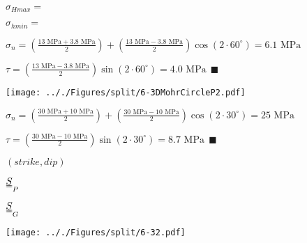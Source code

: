 \documentclass[onecolumn,11pt]{report}
\def\lthtmlcheckvsize{\ifdim\ht\sizebox<\vsize 
  \ifdim\wd\sizebox<\hsize\expandafter\hfill\fi \expandafter\vfill
  \else\expandafter\vss\fi}%
\begin{document}
{\newpage\clearpage
{}%
$ \sigma_{Hmax} =$%
\lthtmlindisplaymathZ
\lthtmlcheckvsize\clearpage}

{\newpage\clearpage
{}%
$ \sigma_{hmin} =$%
\lthtmlindisplaymathZ
\lthtmlcheckvsize\clearpage}

{\newpage\clearpage
{}%
$\displaystyle \sigma_n = \left( \frac{13 \text{ MPa} + 3.8 \text{ MPa}}{2} \right) + \left( \frac{13 \text{ MPa} - 3.8 \text{ MPa}}{2} \right) \cos(2 \cdot 60^{\circ}) = 6.1 \text{ MPa}
$%
\lthtmlindisplaymathZ
\lthtmlcheckvsize\clearpage}

{\newpage\clearpage
{}%
$\displaystyle \tau = \left( \frac{13 \text{ MPa} - 3.8 \text{ MPa}}{2} \right) \sin(2 \cdot 60^{\circ}) = 4.0 \text{ MPa} 
	\: \: \blacksquare
$%
\lthtmlindisplaymathZ
\lthtmlcheckvsize\clearpage}

{\newpage\clearpage
{}%
\texttt{[image: .././Figures/split/6-3DMohrCircleP2.pdf]}%
\lthtmlpictureZ
\lthtmlcheckvsize\clearpage}

{\newpage\clearpage
{}%
$\displaystyle \sigma_n = \left( \frac{30 \text{ MPa} + 10 \text{ MPa}}{2} \right) + \left( \frac{30 \text{ MPa} - 10 \text{ MPa}}{2} \right) \cos(2 \cdot 30^{\circ}) = 25 \text{ MPa}
$%
\lthtmlindisplaymathZ
\lthtmlcheckvsize\clearpage}

{\newpage\clearpage
{}%
$\displaystyle \tau = \left( \frac{30 \text{ MPa} - 10 \text{ MPa}}{2} \right) \sin(2 \cdot 30^{\circ}) = 8.7 \text{ MPa} 
	\: \: \blacksquare
$%
\lthtmlindisplaymathZ
\lthtmlcheckvsize\clearpage}

{\newpage\clearpage
{}%
$ (strike,dip)$%
\lthtmlindisplaymathZ
\lthtmlcheckvsize\clearpage}

{\newpage\clearpage
{}%
$ \uuline{S}_P$%
\lthtmlindisplaymathZ
\lthtmlcheckvsize\clearpage}

{\newpage\clearpage
{}%
$ \uuline{S}_G$%
\lthtmlindisplaymathZ
\lthtmlcheckvsize\clearpage}

{\newpage\clearpage
{}%
\texttt{[image: .././Figures/split/6-32.pdf]}%
\lthtmlpictureZ
\lthtmlcheckvsize\clearpage}
\end{document}

